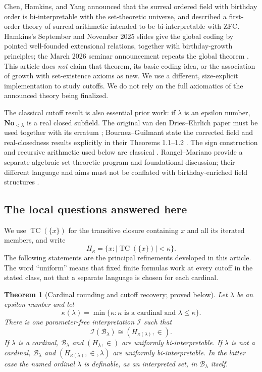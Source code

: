 \documentclass[11pt,letterpaper]{article}
\newtheorem{theorem}{Theorem}[section]
\theoremstyle{definition}
\theoremstyle{remark}
\newcommand{\No}{\mathbf{No}}
\newcommand{\TC}{\operatorname{TC}}
\newcommand{\B}{\mathcal B}
\newcommand{\I}{\mathcal I}
\newcommand{\card}[1]{\lvert#1\rvert}
\newcommand{\ceilcard}[1]{\kappa(#1)}
\begin{document}
Chen, Hamkins, and Yang announced that the surreal ordered field with birthday
order is bi-interpretable with the set-theoretic universe, and described a
first-order theory of surreal arithmetic intended to be bi-interpretable with
ZFC. Hamkins's September and November 2025 slides give the global coding by
pointed well-founded extensional relations, together with birthday-growth
principles; the March 2026 seminar announcement repeats the global theorem
\cite{CHYKobe,CHYNotreDame,CHYCUNY}. This article does \emph{not} claim that
theorem, its basic coding idea, or the association of growth with set-existence
axioms as new. We use a different, size-explicit implementation to study
cutoffs. We do not rely on the full axiomatics of the announced theory being
finalized.

The classical cutoff result is also essential prior work: if $\lambda$ is an
epsilon number, $\No_{<\lambda}$ is a real closed subfield. The original
van den Dries--Ehrlich paper must be used together with its erratum
\cite{vdDE,vdDEerr}; Bournez--Guilmant state the corrected field and
real-closedness results explicitly in their Theorems 1.1--1.2
\cite{BG}. The sign construction and recursive arithmetic used below are
classical \cite{Conway,Gonshor}. Rangel--Mariano provide a separate algebraic
set-theoretic program and foundational discussion; their different language
and aims must not be conflated with birthday-enriched field structures
\cite{RM}.

\subsection{The local questions answered here}

We use $\TC(\{x\})$ for the transitive closure containing $x$ and all its
iterated members, and write
\[
 H_\kappa=\{x:\card{\TC(\{x\})}<\kappa\}.
\]
The following statements are the principal refinements developed in this
article. The word ``uniform'' means that fixed finite formulas work at every
cutoff in the stated class, not that a separate language is chosen for each
cardinal.

\begin{theorem}[Cardinal rounding and cutoff recovery; proved below]
\label{thm:main-rounding}
Let $\lambda$ be an epsilon number and let
\[
 \ceilcard{\lambda}=\min\{\kappa:\kappa\text{ is a cardinal and }\lambda\le\kappa\}.
\]
There is one parameter-free interpretation $\I$ such that
\[
 \I(\B_\lambda)\cong(H_{\ceilcard{\lambda}},\in).
\]
If $\lambda$ is a cardinal, $\B_\lambda$ and $(H_\lambda,\in)$ are uniformly
bi-interpretable. If $\lambda$ is not a cardinal, $\B_\lambda$ and
$(H_{\ceilcard{\lambda}},\in,\lambda)$ are uniformly bi-interpretable.
In the latter case the named ordinal $\lambda$ is definable, as an interpreted
set, in $\B_\lambda$ itself.
\end{theorem}
\end{document}
